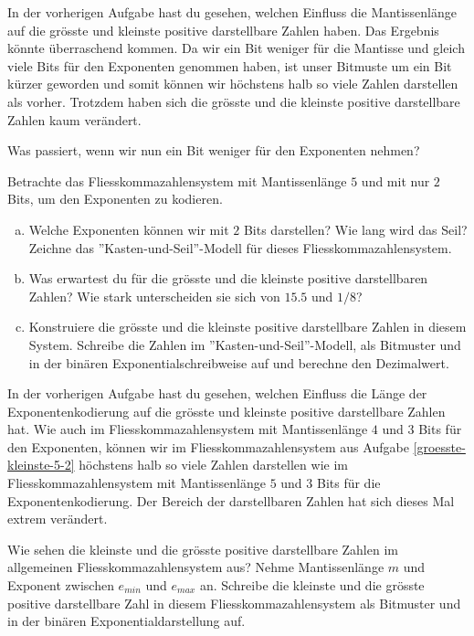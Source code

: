 In der vorherigen Aufgabe hast du gesehen, welchen Einfluss die Mantissenlänge auf die grösste und kleinste positive darstellbare Zahlen haben. Das Ergebnis könnte überraschend kommen. Da wir ein Bit weniger für die Mantisse und gleich viele Bits für den Exponenten genommen haben, ist unser Bitmuste um ein Bit kürzer geworden und somit können wir höchstens halb so viele Zahlen darstellen als vorher. Trotzdem haben sich die grösste und die kleinste positive darstellbare Zahlen kaum verändert.

Was passiert, wenn wir nun ein Bit weniger für den Exponenten nehmen?

\begin{aufgabe}\label{groesste-kleinste-5-2}
Betrachte das Fliesskommazahlensystem mit Mantissenlänge \(5\) und mit nur \(2\) Bits, um den Exponenten zu kodieren.
\begin{enumerate}[(a)]
\item Welche Exponenten können wir mit \(2\) Bits darstellen? Wie lang wird das Seil? Zeichne das ''Kasten-und-Seil''-Modell für dieses Fliesskommazahlensystem.
\item Was erwartest du für die grösste und die kleinste positive darstellbaren Zahlen? Wie stark unterscheiden sie sich von \(15.5\) und \(1/8\)?
\item Konstruiere die grösste und die kleinste positive darstellbare Zahlen in diesem System.  Schreibe die Zahlen im ''Kasten-und-Seil''-Modell, als Bitmuster und in der binären Exponentialschreibweise auf und berechne den Dezimalwert.
\end{enumerate}
\end{aufgabe}

In der vorherigen Aufgabe hast du gesehen, welchen Einfluss die Länge der Exponentenkodierung auf die grösste und kleinste positive darstellbare Zahlen hat. Wie auch im Fliesskommazahlensystem mit Mantissenlänge \(4\) und \(3\) Bits für den Exponenten, können wir im Fliesskommazahlensystem aus Aufgabe \ref{groesste-kleinste-5-2} höchstens halb so viele Zahlen darstellen wie im Fliesskommazahlensystem mit Mantissenlänge \(5\) und \(3\) Bits für die Exponentenkodierung. Der Bereich der darstellbaren Zahlen hat sich dieses Mal extrem verändert.

\begin{aufgabe}\label{groesste-kleinste-allgemein}
Wie sehen die kleinste und die grösste positive darstellbare Zahlen im allgemeinen Fliesskommazahlensystem aus? Nehme Mantissenlänge \(m\) und Exponent zwischen \(e_{min}\) und \(e_{max}\) an. Schreibe die kleinste und die grösste positive darstellbare Zahl in diesem Fliesskommazahlensystem als Bitmuster und in der binären Exponentialdarstellung auf.
\end{aufgabe}



